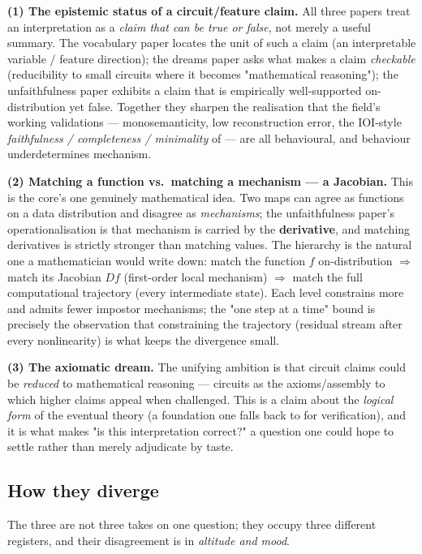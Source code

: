 \textbf{(1) The epistemic status of a circuit/feature claim.} All three papers treat an interpretation as a \emph{claim that can be true or false}, not merely a useful summary. The vocabulary paper locates the unit of such a claim (an interpretable variable / feature direction); the dreams paper asks what makes a claim \emph{checkable} (reducibility to small circuits where it becomes "mathematical reasoning"); the unfaithfulness paper exhibits a claim that is empirically well-supported on-distribution yet false. Together they sharpen the realisation that the field's working validations --- monosemanticity, low reconstruction error, the IOI-style \emph{faithfulness / completeness / minimality} of \textcite{interpretability-in-the-wild-ioi} --- are all behavioural, and behaviour underdetermines mechanism.

\textbf{(2) Matching a function vs.\ matching a mechanism --- a Jacobian.} This is the core's one genuinely mathematical idea. Two maps can agree as functions on a data distribution and disagree as \emph{mechanisms}; the unfaithfulness paper's operationalisation is that mechanism is carried by the \textbf{derivative}, and matching derivatives is strictly stronger than matching values. The hierarchy is the natural one a mathematician would write down: match the function $f$ on-distribution $\Rightarrow$ match its Jacobian $Df$ (first-order local mechanism) $\Rightarrow$ match the full computational trajectory (every intermediate state). Each level constrains more and admits fewer impostor mechanisms; the "one step at a time" bound is precisely the observation that constraining the trajectory (residual stream after every nonlinearity) is what keeps the divergence small.

\textbf{(3) The axiomatic dream.} The unifying ambition is that circuit claims could be \emph{reduced} to mathematical reasoning --- circuits as the axioms/assembly to which higher claims appeal when challenged. This is a claim about the \emph{logical form} of the eventual theory (a foundation one falls back to for verification), and it is what makes "is this interpretation correct?" a question one could hope to settle rather than merely adjudicate by taste.


\subsection*{How they diverge}

The three are not three takes on one question; they occupy three different registers, and their disagreement is in \emph{altitude and mood}.

